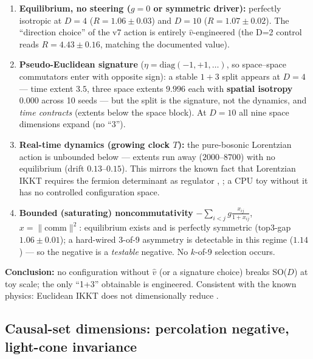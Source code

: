\documentclass[12pt,a4paper]{article}
\providecommand{\tightlist}{%
  \setlength{\itemsep}{0pt}\setlength{\parskip}{0pt}}
\begin{document}
\begin{enumerate}
\def\labelenumi{\arabic{enumi}.}
\tightlist
\item
  \textbf{Equilibrium, no steering (\(g=0\) or symmetric driver):}
  perfectly isotropic at \(D=4\) (\(R=1.06\pm0.03\)) and \(D=10\)
  (\(R=1.07\pm0.02\)). The ``direction choice'' of the v7 action is
  entirely \(\hat v\)-engineered (the D=2 control reads
  \(R=4.43\pm0.16\), matching the documented value).
\item
  \textbf{Pseudo-Euclidean signature}
  (\(\eta=\mathrm{diag}(-1,+1,\dots)\), so space--space commutators
  enter with opposite sign): a stable \(1{+}3\) split appears at \(D=4\)
  --- time extent \(3.5\), three space extents \(9.996\) each with
  \textbf{spatial isotropy \(0.000\)} across 10 seeds --- but the split
  is the signature, not the dynamics, and \emph{time contracts} (extents
  below the space block). At \(D=10\) all nine space dimensions expand
  (no ``3'').
\item
  \textbf{Real-time dynamics (growing clock \(T\)):} the pure-bosonic
  Lorentzian action is unbounded below --- extents run away
  (\(2000\)--\(8700\)) with no equilibrium (drift \(0.13\)--\(0.15\)).
  This mirrors the known fact that Lorentzian IKKT requires the fermion
  determinant as regulator \cite{kim_nishimura_2011},
  \cite{kim_nishimura_2012}; a CPU toy without it has no controlled
  configuration space.
\item
  \textbf{Bounded (saturating) noncommutativity}
  \(-\sum_{i<j} g\frac{x_{ij}}{1+x_{ij}}\), \(x=\|\mathrm{comm}\|^2\):
  equilibrium exists and is perfectly symmetric (\(\mathrm{top3}\)-gap
  \(1.06\pm0.01\)); a hard-wired 3-of-9 asymmetry is detectable in this
  regime (\(1.14\)) --- so the negative is a \emph{testable} negative.
  No \(k\)-of-9 selection occurs.
\end{enumerate}

\textbf{Conclusion:} no configuration without \(\hat v\) (or a signature
choice) breaks SO(\(D\)) at toy scale; the only ``1+3'' obtainable is
engineered. Consistent with the known physics: Euclidean IKKT does not
dimensionally reduce \cite{ishibashi_kawai_kitazawa_tsuchiya_1997}.

\subsection{Causal-set dimensions: percolation negative,
light-cone
invariance}\label{causal-set-dimensions-percolation-negative-light-cone-invariance}
\end{document}
